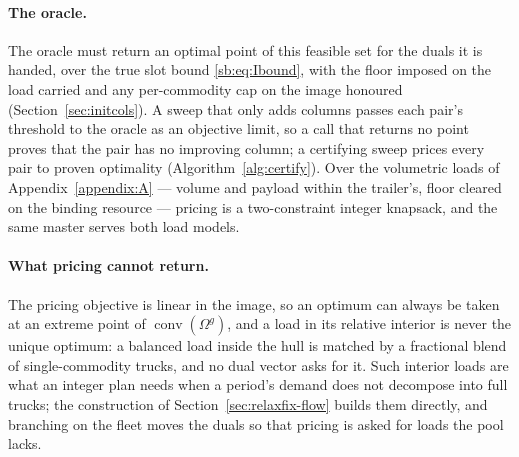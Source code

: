 \paragraph{The oracle.}
The oracle must return an optimal point of this feasible set for the
duals it is handed, over the true slot bound \eqref{sb:eq:Ibound}, with
the floor imposed on the load carried and any per-commodity cap on the
image honoured (Section~\ref{sec:initcols}). A sweep that only adds
columns passes each pair's threshold to the oracle as an objective
limit, so a call that returns no point proves that the pair has no
improving column; a certifying sweep prices every pair to proven
optimality (Algorithm~\ref{alg:certify}). Over the volumetric loads of
Appendix~\ref{appendix:A} --- volume and payload within the trailer's,
floor cleared on the binding resource --- pricing is a two-constraint
integer knapsack, and the same master serves both load models.



\paragraph{What pricing cannot return.}
The pricing objective is linear in the image, so an optimum can
always be taken at an extreme point of $\operatorname{conv}(\Omega^{g})$,
and a load in its relative interior is never the unique optimum: a
balanced load inside the hull is matched by a fractional blend of
single-commodity trucks, and no dual vector asks for it. Such interior loads are what an
integer plan needs when a period's demand does not decompose into full
trucks; the construction of Section~\ref{sec:relaxfix-flow} builds
them directly, and branching on the fleet moves the duals so that
pricing is asked for loads the pool lacks.
